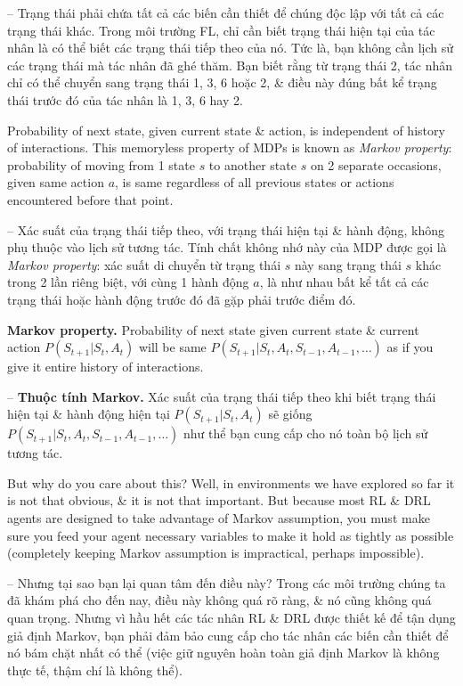 \documentclass{article}
\begin{document}
\begin{itemize}
\begin{itemize}
        -- Trạng thái phải chứa tất cả các biến cần thiết để chúng độc lập với tất cả các trạng thái khác. Trong môi trường FL, chỉ cần biết trạng thái hiện tại của tác nhân là có thể biết các trạng thái tiếp theo của nó. Tức là, bạn không cần lịch sử các trạng thái mà tác nhân đã ghé thăm. Bạn biết rằng từ trạng thái 2, tác nhân chỉ có thể chuyển sang trạng thái 1, 3, 6 hoặc 2, \& điều này đúng bất kể trạng thái trước đó của tác nhân là 1, 3, 6 hay 2.

        Probability of next state, given current state \& action, is independent of history of interactions. This memoryless property of MDPs is known as {\it Markov property}: probability of moving from 1 state $s$ to another state $s$ on 2 separate occasions, given same action $a$, is same regardless of all previous states or actions encountered before that point.

        -- Xác suất của trạng thái tiếp theo, với trạng thái hiện tại \& hành động, không phụ thuộc vào lịch sử tương tác. Tính chất không nhớ này của MDP được gọi là {\it Markov property}: xác suất di chuyển từ trạng thái $s$ này sang trạng thái $s$ khác trong 2 lần riêng biệt, với cùng 1 hành động $a$, là như nhau bất kể tất cả các trạng thái hoặc hành động trước đó đã gặp phải trước điểm đó.

        {\bf Markov property.} Probability of next state given current state \& current action $P(S_{t+1}|S_t,A_t)$ will be same $P(S_{t+1}|S_t,A_t,S_{t-1},A_{t-1},\ldots)$ as if you give it entire history of interactions.

        -- {\bf Thuộc tính Markov.} Xác suất của trạng thái tiếp theo khi biết trạng thái hiện tại \& hành động hiện tại $P(S_{t+1}|S_t,A_t)$ sẽ giống $P(S_{t+1}|S_t,A_t,S_{t-1},A_{t-1},\ldots)$ như thể bạn cung cấp cho nó toàn bộ lịch sử tương tác.

        But why do you care about this? Well, in environments we have explored so far it is not that obvious, \& it is not that important. But because most RL \& DRL agents are designed to take advantage of Markov assumption, you must make sure you feed your agent necessary variables to make it hold as tightly as possible (completely keeping Markov assumption is impractical, perhaps impossible).

        -- Nhưng tại sao bạn lại quan tâm đến điều này? Trong các môi trường chúng ta đã khám phá cho đến nay, điều này không quá rõ ràng, \& nó cũng không quá quan trọng. Nhưng vì hầu hết các tác nhân RL \& DRL được thiết kế để tận dụng giả định Markov, bạn phải đảm bảo cung cấp cho tác nhân các biến cần thiết để nó bám chặt nhất có thể (việc giữ nguyên hoàn toàn giả định Markov là không thực tế, thậm chí là không thể).


\end{itemize}
\end{itemize}
\end{document}

